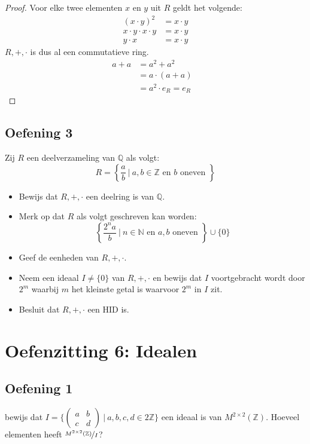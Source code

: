 \documentclass[main.tex]{subfiles}
\begin{document}
\begin{proof}
  Voor elke twee elementen $x$ en $y$ uit $R$ geldt het volgende:
  \[
  \begin{array}{rl}
    (x \cdot y)^{2} &= x \cdot y\\
    x \cdot y \cdot x \cdot y &= x \cdot y\\
    y \cdot x &= x \cdot y
  \end{array}
  \]
  $R,+,\cdot$ is dus al een commutatieve ring.
  \[
  \begin{array}{rll}
    a + a &= a^{2} + a^{2} &\\
          &= a \cdot (a+a) &\\
          &= a^{2} \cdot e_{R} = e_{R}
  \end{array}
  \]
\end{proof}


\subsection*{Oefening 3}
Zij $R$ een deelverzameling van $\mathbb{Q}$ als volgt:
\[ R = \left\{ \frac{a}{b} \ |\ a,b \in \mathbb{Z} \text{ en } b \text{ oneven } \right\} \]
\begin{itemize}
\item Bewijs dat $R,+,\cdot$ een deelring is van $\mathbb{Q}$.
\item Merk op dat $R$ als volgt geschreven kan worden:
  \[ \left\{ \frac{2^{n}a}{b}\ |\ n\in \mathbb{N}\text{ en } a,b \text { oneven } \right\} \cup \{0\} \]
\item Geef de eenheden van $R,+,\cdot$.
\item Neem een ideaal $I \neq \{0\}$ van $R,+,\cdot$ en bewijs dat $I$ voortgebracht wordt door $2^{m}$ waarbij $m$ het kleinste getal is waarvoor $2^{m}$ in $I$ zit.
\item Besluit dat $R,+,\cdot$ een HID is.
\end{itemize}

\section{Oefenzitting 6: Idealen}

\subsection{Oefening 1}
bewijs dat $I=\{  \begin{pmatrix}    a & b\\c & d  \end{pmatrix} \ |\ a,b,c,d \in 2\mathbb{Z}\}$ een ideaal is van $M^{2\times 2}(\mathbb{Z})$. Hoeveel elementen heeft $\nicefrac{M^{2\times 2}(\mathbb{Z})}{I}$?
\end{document}
